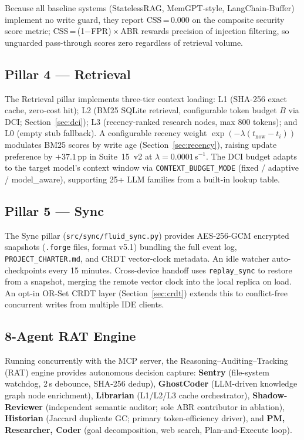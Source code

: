 \documentclass[11pt,twocolumn]{article}
\begin{document}
Because all baseline systems (StatelessRAG, MemGPT-style, LangChain-Buffer)
implement no write guard, they report CSS\,=\,0.000 on the composite security
score metric; CSS\,=\,(1$-$FPR)\,$\times$\,ABR rewards precision of injection
filtering, so unguarded pass-through scores zero regardless of retrieval
volume.

\subsection{Pillar 4 --- Retrieval}

The Retrieval pillar implements three-tier context loading:
L1 (SHA-256 exact cache, zero-cost hit);
L2 (BM25 SQLite retrieval, configurable token budget $B$ via DCI;
Section~\ref{sec:dci});
L3 (recency-ranked research nodes, max 800 tokens);
and L0 (empty stub fallback).
A configurable recency weight $\exp(-\lambda(t_{\mathrm{now}}-t_i))$
modulates BM25 scores by write age (Section~\ref{sec:recency}), raising
update preference by $+37.1$\,pp in Suite~15~v2 at $\lambda=0.0001$\,s$^{-1}$.
The DCI budget adapts to the target model's context window via
\texttt{CONTEXT\_BUDGET\_MODE} (fixed / adaptive / model\_aware), supporting
25+ LLM families from a built-in lookup table.

\subsection{Pillar 5 --- Sync}

The Sync pillar (\texttt{src/sync/fluid\_sync.py}) provides AES-256-GCM
encrypted snapshots (\texttt{.forge} files, format v5.1) bundling the full
event log, \texttt{PROJECT\_CHARTER.md}, and CRDT vector-clock metadata.
An idle watcher auto-checkpoints every 15 minutes. Cross-device handoff uses
\texttt{replay\_sync} to restore from a snapshot, merging the remote vector
clock into the local replica on load. An opt-in OR-Set CRDT layer
(Section~\ref{sec:crdt}) extends this to conflict-free concurrent writes from
multiple IDE clients.

\subsection{8-Agent RAT Engine}

Running concurrently with the MCP server, the Reasoning--Auditing--Tracking
(RAT) engine provides autonomous decision capture:
\textbf{Sentry} (file-system watchdog, 2\,s debounce, SHA-256 dedup),
\textbf{GhostCoder} (LLM-driven knowledge graph node enrichment),
\textbf{Librarian} (L1/L2/L3 cache orchestrator),
\textbf{Shadow-Reviewer} (independent semantic auditor; sole ABR
contributor in ablation),
\textbf{Historian} (Jaccard duplicate GC; primary token-efficiency driver),
and \textbf{PM, Researcher, Coder} (goal decomposition, web search,
Plan-and-Execute loop).
\end{document}
